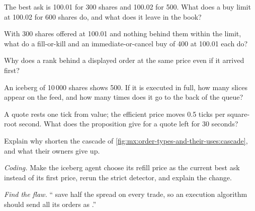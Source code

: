\begin{exercise}[$\star$]\label{exo:mx:order-types-and-their-uses:1}
The best ask is 100.01 for 300 shares and 100.02 for 500. What does a buy limit at 100.02 for 600 shares do, and what does it leave in the book?
\end{exercise}

\begin{exercise}[$\star$]\label{exo:mx:order-types-and-their-uses:2}
With 300 shares offered at 100.01 and nothing behind them within the limit, what do a fill-or-kill and an immediate-or-cancel buy of 400 at 100.01 each do?
\end{exercise}

\begin{exercise}[$\star$]\label{exo:mx:order-types-and-their-uses:3}
Why does a  rank behind a displayed order at the same price even if it arrived first?
\end{exercise}

\begin{exercise}[$\star\star$]\label{exo:mx:order-types-and-their-uses:4}
An iceberg of 10\,000 shares shows 500. If it is executed in full, how many slices appear on the feed, and how many times does it go to the back of
the queue?
\end{exercise}

\begin{exercise}[$\star\star$]\label{exo:mx:order-types-and-their-uses:5}
A quote rests one tick from value; the efficient price moves 0.5 ticks per square-root second. What does the proposition give for a quote left for
30 seconds?
\end{exercise}

\begin{exercise}[$\star\star$]\label{exo:mx:order-types-and-their-uses:6}
Explain why  shorten the cascade of \cref{fig:mx:order-types-and-their-uses:cascade}, and what their owners give up.
\end{exercise}

\begin{exercise}[$\star\star\star$]\label{exo:mx:order-types-and-their-uses:7}
\emph{Coding.} Make the iceberg agent choose its refill price as the current best ask instead of its first price, rerun the strict detector, and explain
the change.
\end{exercise}

\begin{exercise}[$\star\star\star$]\label{exo:mx:order-types-and-their-uses:8}
\emph{Find the flaw.} `` save half the spread on every trade, so an execution algorithm should send all its orders as .''
\end{exercise}

